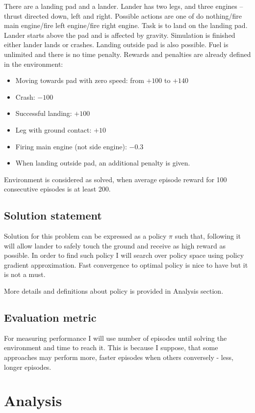 \documentclass[12pt]{article}
\begin{document}
There are a landing pad and a lander. Lander has two legs, and three engines – thrust directed down, left and right. Possible actions are one of do nothing/fire main engine/fire left engine/fire right engine.  Task is to land on the landing pad.  Lander starts above the pad and is affected by gravity. Simulation is finished either lander lands or crashes. Landing outside pad is also possible. Fuel is unlimited and there is no time penalty.
Rewards and penalties are already defined in the environment:
\begin{itemize}
\item Moving towards pad with zero speed: from $+100$ to $+140$
\item Crash: $-100$
\item Successful landing: $+100$
\item Leg with ground contact: $+10$
\item Firing main engine (not side engine): $-0.3$
\item When landing outside pad, an additional penalty is given.
\end{itemize}

Environment is considered as solved, when average episode reward for 100 consecutive episodes is at least 200.

\subsection{Solution statement}

Solution for this problem can be expressed as a policy $\pi$ such that, following it will allow lander to safely touch the ground and receive as high reward as possible. In order to find such policy I will search over policy space using policy gradient approximation. Fast convergence to optimal policy is nice to have but it is not a must.

More details and definitions about policy is provided in Analysis section.

\subsection{Evaluation metric}

For measuring performance I will use number of episodes until solving the environment and time to reach it. This is because I suppose, that some approaches may perform more, faster episodes when others conversely - less, longer episodes.

\section{Analysis}
\end{document}
